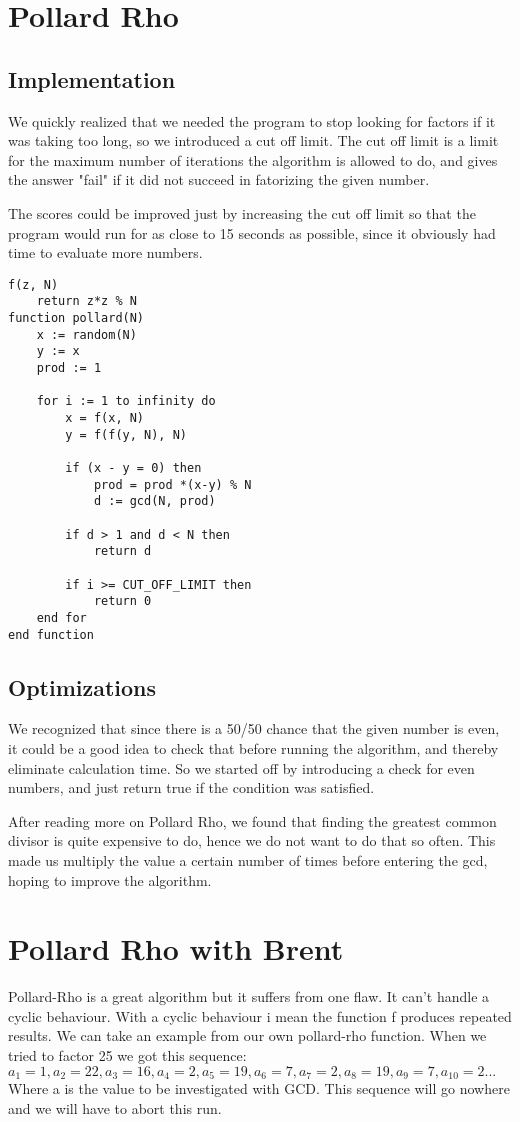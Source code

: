 \documentclass[a4paper, 12pt]{report}
\begin{document}
\section{Pollard Rho}
\subsection{Implementation}

We quickly realized that we needed the program to stop looking for factors if it was taking too long, so we introduced a cut off limit. The cut off limit is a limit for the maximum number of iterations the algorithm is allowed to do, and gives the answer "fail" if it did not succeed in fatorizing the given number. 

The scores could be improved just by increasing the cut off limit so that the program would run for as close to 15 seconds as possible, since it obviously had time to evaluate more numbers.

\begin{lstlisting}[frame=single] 
f(z, N)
	return z*z % N
function pollard(N) 
	x := random(N) 
	y := x 	
	prod := 1

	for i := 1 to infinity do
		x = f(x, N)
		y = f(f(y, N), N)

		if (x - y = 0) then
			prod = prod *(x-y) % N
			d := gcd(N, prod)

		if d > 1 and d < N then
			return d

		if i >= CUT_OFF_LIMIT then
			return 0
	end for
end function
\end{lstlisting}

\subsection{Optimizations}
We recognized that since there is a 50/50 chance that the given number is even, it could be a good idea to check that before running the algorithm, and thereby eliminate calculation time. So we started off by introducing a check for even numbers, and just return true if the condition was satisfied.

After reading more on Pollard Rho, we found that finding the greatest common divisor is quite expensive to do, hence we do not want to do that so often. This made us multiply the value a certain number of times before entering the gcd, hoping to improve the algorithm.

\section{Pollard Rho with Brent}
Pollard-Rho is a great algorithm but it suffers from one flaw. It can't handle a cyclic behaviour. With a cyclic behaviour i mean the function f produces repeated results. We can take an example from our own pollard-rho function. When we tried to factor 25 we got this sequence:
$a_1=1, a_2=22, a_3=16, a_4=2, a_5=19, a_6=7, a_7=2, a_8=19, a_9=7, a_10=2 ...$
Where a is the value to be investigated with GCD. This sequence will go nowhere and we will have to abort this run.
\end{document}
